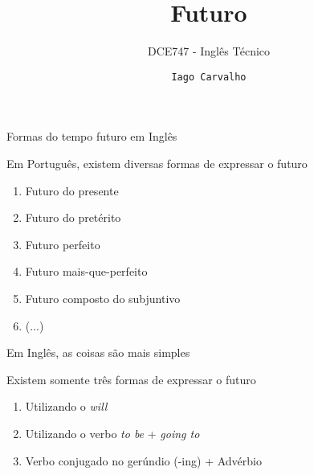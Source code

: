 \documentclass[compress,mathserif,xcolor=table]{beamer}
\title{Futuro}
\subtitle{DCE747 - Inglês Técnico}
\author{\texttt{Iago Carvalho}}
\institute{\texttt{Departamento de Ciência da Computação}}
\begin{document}
\begin{frame}
\titlepage

\end{frame}


\begin{frame}{Formas do tempo futuro em Inglês}

Em Português, existem diversas formas de expressar o futuro

\begin{enumerate}
    \item Futuro do presente
    \item Futuro do pretérito
    \item Futuro perfeito
    \item Futuro mais-que-perfeito
    \item Futuro composto do subjuntivo
    \item (...)
\end{enumerate}

\vspace{0.5cm}

Em Inglês, as coisas são mais simples

Existem somente três formas de expressar o futuro

\begin{enumerate}
    \item Utilizando o \textit{will}
    \item Utilizando o verbo \textit{to be} + \textit{going to}
    \item Verbo conjugado no gerúndio (-ing) + Advérbio
\end{enumerate}
\end{frame}

\end{document}
